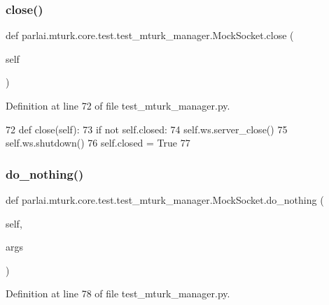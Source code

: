 \subsubsection{\texorpdfstring{close()}{close()}}
{\footnotesize\ttfamily def parlai.\+mturk.\+core.\+test.\+test\+\_\+mturk\+\_\+manager.\+Mock\+Socket.\+close (\begin{DoxyParamCaption}\item[{}]{self }\end{DoxyParamCaption})}



Definition at line 72 of file test\+\_\+mturk\+\_\+manager.\+py.


\begin{DoxyCode}
72     \textcolor{keyword}{def }close(self):
73         \textcolor{keywordflow}{if} \textcolor{keywordflow}{not} self.closed:
74             self.ws.server\_close()
75             self.ws.shutdown()
76             self.closed = \textcolor{keyword}{True}
77 
\end{DoxyCode}
\mbox{\label{classparlai_1_1mturk_1_1core_1_1test_1_1test__mturk__manager_1_1MockSocket_ab9a60af1ed619d0f22407addd7e7414a}} 
\subsubsection{\texorpdfstring{do\+\_\+nothing()}{do\_nothing()}}
{\footnotesize\ttfamily def parlai.\+mturk.\+core.\+test.\+test\+\_\+mturk\+\_\+manager.\+Mock\+Socket.\+do\+\_\+nothing (\begin{DoxyParamCaption}\item[{}]{self,  }\item[{}]{args }\end{DoxyParamCaption})}



Definition at line 78 of file test\+\_\+mturk\+\_\+manager.\+py.


